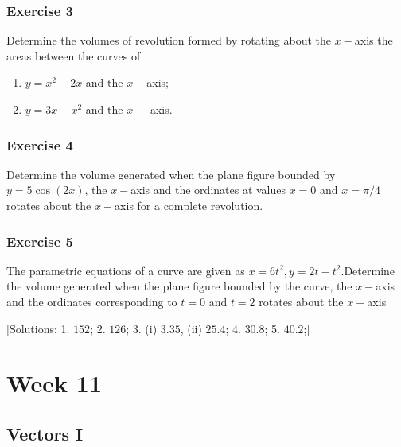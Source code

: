 \documentclass[
  11pt,
  oneside]{book}
\providecommand{\tightlist}{%
  \setlength{\itemsep}{0pt}\setlength{\parskip}{0pt}}
\newcommand{\slide}{}
\theoremstyle{definition}
\theoremstyle{definition}
\theoremstyle{definition}
\theoremstyle{definition}
\theoremstyle{remark}
\begin{document}
\slide

\subsection*{Exercise 3}\label{exercise-3-9}

Determine the volumes of revolution formed by rotating about the \(x-\)axis the areas between the curves of

\begin{enumerate}
\def\labelenumi{\roman{enumi}.}
\tightlist
\item
  \(y = x^2 - 2x\) and the \(x-\)axis;
\item
  \(y = 3x - x^2\) and the \(x-\) axis.
\end{enumerate}

\slide

\subsection*{Exercise 4}\label{exercise-4-7}

Determine the volume generated when the plane figure bounded by \(y = 5\cos(2x)\), the \(x-\)axis and the ordinates at values \(x = 0\) and \(x = \pi/4\) rotates about the \(x-\)axis for a complete revolution.

\slide

\subsection*{Exercise 5}\label{exercise-5-5}

The parametric equations of a curve are given as \(x = 6t^2, y = 2t - t^2\).Determine the volume generated when the plane figure bounded by the curve, the \(x-\)axis and the ordinates corresponding to \(t = 0\) and \(t = 2\) rotates about the \(x-\)axis

{[}Solutions:
1. \(152\);
2. \(126\);
3. (i) \(3.35\), (ii) \(25.4\);
4. \(30.8\);
5. \(40.2\);{]}

\chapter{Week 11}\label{week-eleven}

\slide

\section{Vectors I}\label{vectors-i}
\end{document}

